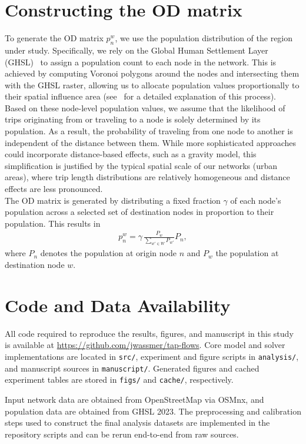 \documentclass[twocolumn,english,groupedaddress, superscriptaddress,aps,pre,10pt,floatfix]{revtex4-2}
\begin{document}
\section{Constructing the OD matrix}\label{sec:od-matrix}
To generate the OD matrix $p_n^w$, we use the population distribution of the region under study. Specifically, we rely on the Global Human Settlement Layer (GHSL)~\cite{GHSL2023} to assign a population count to each node in the network. This is achieved by computing Voronoi polygons around the nodes and intersecting them with the GHSL raster, allowing us to allocate population values proportionally to their spatial influence area (see~\citep{wassmer2024resilience, wassmer2025unveiling} for a detailed explanation of this process).\\

Based on these node-level population values, we assume that the likelihood of trips originating from or traveling to a node is solely determined by its population. As a result, the probability of traveling from one node to another is independent of the distance between them. While more sophisticated approaches could incorporate distance-based effects, such as a gravity model, this simplification is justified by the typical spatial scale of our networks (urban areas), where trip length distributions are relatively homogeneous and distance effects are less pronounced.\\

The OD matrix is generated by distributing a fixed fraction $\gamma$ of each node’s population across a selected set of destination nodes in proportion to their population. This results in
\begin{align*}
    p_n^w = \gamma \, \frac{P_w}{\sum_{w' \in W} P_{w'}} P_n,
\end{align*}
where $P_n$ denotes the population at origin node $n$ and $P_w$ the population at destination node $w$. 


\section*{Code and Data Availability}
All code required to reproduce the results, figures, and manuscript in this study is available at \url{https://github.com/jwassmer/tap-flows}. Core model and solver implementations are located in \texttt{src/}, experiment and figure scripts in \texttt{analysis/}, and manuscript sources in \texttt{manuscript/}. Generated figures and cached experiment tables are stored in \texttt{figs/} and \texttt{cache/}, respectively.

Input network data are obtained from OpenStreetMap via OSMnx, and population data are obtained from GHSL 2023\cite{GHSL2023}. The preprocessing and calibration steps used to construct the final analysis datasets are implemented in the repository scripts and can be rerun end-to-end from raw sources.








\end{document}
